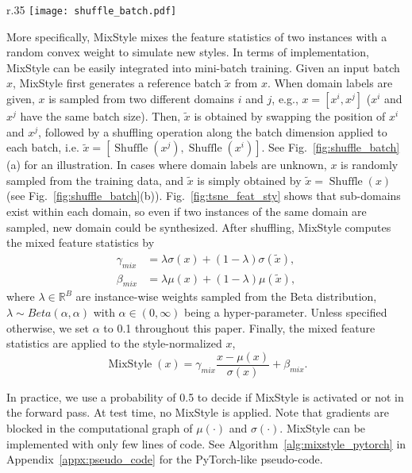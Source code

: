 \documentclass{article} \usepackage{iclr2021_conference,times}
\begin{document}
\begin{wrapfigure}{r}{.35\textwidth}
\vspace{-.3cm}
\centering
\texttt{[image: shuffle\_batch.pdf]}
\caption{A graphical illustration of how a reference batch is generated. Domain label is denoted by color.}
\label{fig:shuffle_batch}
\vspace{-.3cm}
\end{wrapfigure}

More specifically, MixStyle mixes the feature statistics of two instances with a random convex weight to simulate new styles. In terms of implementation, MixStyle can be easily integrated into mini-batch training. Given an input batch $x$, MixStyle first generates a reference batch $\tilde{x}$ from $x$. When domain labels are given, $x$ is sampled from two different domains $i$ and $j$, e.g., $x=[x^i, x^j]$ ($x^i$ and $x^j$ have the same batch size). Then, $\tilde{x}$ is obtained by swapping the position of $x^i$ and $x^j$, followed by a shuffling operation along the batch dimension applied to each batch, i.e. $\tilde{x} = [\operatorname{Shuffle}(x^j), \operatorname{Shuffle}(x^i)]$. See Fig.~\ref{fig:shuffle_batch}(a) for an illustration. In cases where domain labels are unknown, $x$ is randomly sampled from the training data, and $\tilde{x}$ is simply obtained by $\tilde{x} = \operatorname{Shuffle}(x)$ (see Fig.~\ref{fig:shuffle_batch}(b)). Fig.~\ref{fig:tsne_feat_sty} shows that sub-domains exist within each domain, so even if two instances of the same domain are sampled, new domain could be synthesized. After shuffling, MixStyle computes the mixed feature statistics by
\begin{align}
\gamma_{mix} &= \lambda \sigma(x) + (1 - \lambda) \sigma(\tilde{x}), \label{eq:mix_gamma} \\
\beta_{mix} &= \lambda \mu(x) + (1 - \lambda) \mu(\tilde{x}), \label{eq:mix_jeta}
\end{align}
where $\lambda \in \mathbb{R}^B$ are instance-wise weights sampled from the Beta distribution, $\lambda \sim Beta(\alpha, \alpha)$ with $\alpha \in (0, \infty)$ being a hyper-parameter. Unless specified otherwise, we set $\alpha$ to 0.1 throughout this paper. Finally, the mixed feature statistics are applied to the style-normalized $x$,
\begin{equation}
\operatorname{MixStyle}(x) = \gamma_{mix} \frac{x - \mu(x)}{\sigma(x)} + \beta_{mix}.
\end{equation}

In practice, we use a probability of 0.5 to decide if MixStyle is activated or not in the forward pass. At test time, no MixStyle is applied. Note that gradients are blocked in the computational graph of $\mu(\cdot)$ and $\sigma(\cdot)$. MixStyle can be implemented with only few lines of code. See Algorithm~\ref{alg:mixstyle_pytorch} in Appendix~\ref{appx:pseudo_code} for the PyTorch-like pseudo-code.
\end{document}
